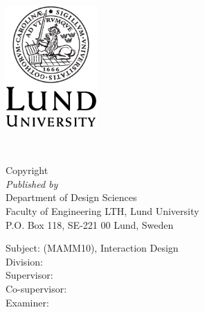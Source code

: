 \documentclass[a4paper,11pt]{article}
\newcommand\HOne{\fontsize{20}{12}\selectfont}
\begin{document}
{  
}

\newpage

\begin{center}
  {\HOne \titleFull} \\
  \vspace{2.5cm}
  {\large \name} \\
  \vspace{2.0cm}
  \includegraphics[width=3.5cm]{LU-logotyp-tryck-digitalt/EPS_for_tryck/Engelska/LundUniversity_C2line_BLACK.eps}

\end{center}



\newpage

{\Large \titleFull}
\vspace{1.5cm} \\
\begin{large}
  Copyright \textcopyright \ \the\year \ \name \\

  \textit{Published by} \vspace{0.2cm} \\
      Department of Design Sciences \\
      Faculty of Engineering LTH, Lund University \\
      P.O. Box 118, SE-221 00 Lund, Sweden

  \vspace{0.8cm}
  Subject: (MAMM10), Interaction Design \\
  Division: \division \\
  Supervisor: \supervisor \\
  Co-supervisor: \contact \\
  Examiner: \examiner \\


\end{large}
\end{document}
